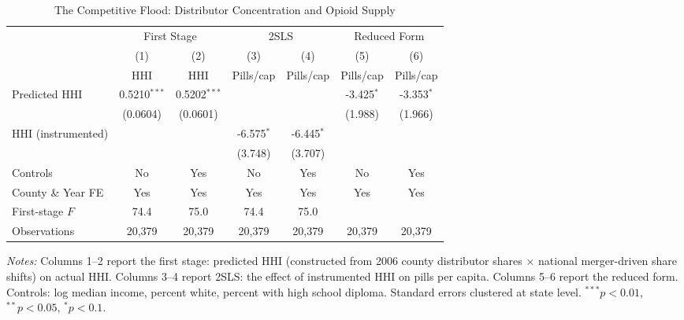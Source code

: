 \begin{table}[htbp]
\centering
\caption{The Competitive Flood: Distributor Concentration and Opioid Supply}
\label{tab:main}
\begin{threeparttable}
\begin{tabular}{lcccccc}
\hline\hline
 & \multicolumn{2}{c}{First Stage} & \multicolumn{2}{c}{2SLS} & \multicolumn{2}{c}{Reduced Form} \\
\cmidrule(lr){2-3} \cmidrule(lr){4-5} \cmidrule(lr){6-7}
 & (1) & (2) & (3) & (4) & (5) & (6) \\
 & HHI & HHI & Pills/cap & Pills/cap & Pills/cap & Pills/cap \\
\hline
Predicted HHI & 0.5210$^{***}$ & 0.5202$^{***}$ & & & -3.425$^{*}$ & -3.353$^{*}$ \\
 & (0.0604) & (0.0601) & & & (1.988) & (1.966) \\
HHI (instrumented) & & & -6.575$^{*}$ & -6.445$^{*}$ & & \\
 & & & (3.748) & (3.707) & & \\
\hline
Controls & No & Yes & No & Yes & No & Yes \\
County \& Year FE & Yes & Yes & Yes & Yes & Yes & Yes \\
First-stage $F$ & 74.4 & 75.0 & 74.4 & 75.0 & & \\
Observations & 20,379 & 20,379 & 20,379 & 20,379 & 20,379 & 20,379 \\
\hline\hline
\end{tabular}
\begin{tablenotes}[flushleft]
\small
\item \textit{Notes:} Columns 1--2 report the first stage: predicted HHI (constructed from 2006 county distributor shares $\times$ national merger-driven share shifts) on actual HHI. Columns 3--4 report 2SLS: the effect of instrumented HHI on pills per capita. Columns 5--6 report the reduced form. Controls: log median income, percent white, percent with high school diploma. Standard errors clustered at state level. $^{***}p<0.01$, $^{**}p<0.05$, $^{*}p<0.1$.
\end{tablenotes}
\end{threeparttable}
\end{table}

